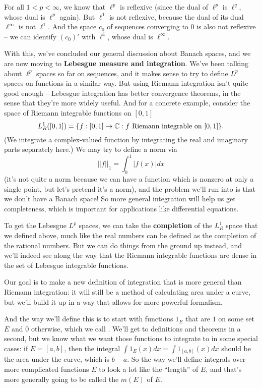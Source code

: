 \begin{example}
For all $1 < p < \infty$, we know that $\ell^p$ is reflexive (since the dual of $\ell^p$ is $\ell^q$, whose dual is $\ell^p$ again). But $\ell^1$ is not reflexive, because the dual of its dual $\ell^{\infty}$ is not $\ell^1$. And the space $c_0$ of sequences converging to $0$ is also not reflexive -- we can identify $(c_0)'$ with $\ell^1$, whose dual is $\ell^{\infty}$.
\end{example}

With this, we've concluded our general discussion about Banach spaces, and we are now moving to \textbf{Lebesgue measure and integration}. We've been talking about $\ell^p$ spaces so far on sequences, and it makes sense to try to define $L^p$ spaces on functions in a similar way. But using Riemann integration isn't quite good enough -- Lebesgue integration has better convergence theorems, in the sense that they're more widely useful. And for a concrete example, consider the space of Riemann integrable functions on $[0, 1]$
\[
    L^1_R([0, 1]) = \{f: [0, 1] \to \mathbb C: f \text{ Riemann integrable on }[0, 1]\}.
\]
(We integrate a complex-valued function by integrating the real and imaginary parts separately here.) We may try to define a norm via 
\[
    ||f||_1 = \int_0^1 |f(x)| dx
\]
(it's not quite a norm because we can have a function which is nonzero at only a single point, but let's pretend it's a norm), and the problem we'll run into is that we don't have a Banach space! So more general integration will help us get completeness, which is important for applications like differential equations.

To get the Lebesgue $L^p$ spaces, we can take the \textbf{completion} of the $L_R^1$ space that we defined above, much like the real numbers can be defined as the completion of the rational numbers. But we can do things from the ground up instead, and we'll indeed see along the way that the Riemann integrable functions are dense in the set of Lebesgue integrable functions.

\begin{fact}
Our goal is to make a new definition of integration that is more general than Riemann integration: it will still be a method of calculating area under a curve, but we'll build it up in a way that allows for more powerful formalism.
\end{fact}

And the way we'll define this is to start with functions $1_E$ that are $1$ on some set $E$ and $0$ otherwise, which we call . We'll get to definitions and theorems in a second, but we know what we want those functions to integrate to in some special cases: if $E = [a, b]$, then the integral $\int 1_E(x) dx = \int 1_{[a, b]}(x) dx$ should be the area under the curve, which is $b-a$. So the way we'll define integrals over more complicated functions $E$ to look a lot like the ``length'' of $E$, and that's more generally going to be called the  $m(E)$ of $E$. 

